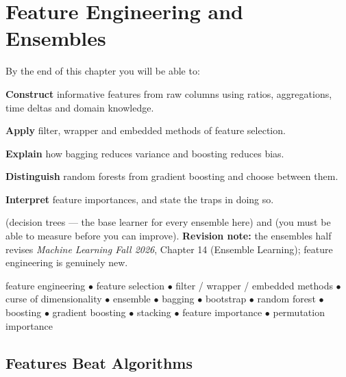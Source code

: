 \chapter{Feature Engineering and Ensembles}\label{ch:features}

\begin{outcomes}
By the end of this chapter you will be able to:
\begin{tight}
  \item \textbf{Construct} informative features from raw columns using ratios, aggregations, time deltas and domain knowledge.
  \item \textbf{Apply} filter, wrapper and embedded methods of feature selection.
  \item \textbf{Explain} how bagging reduces variance and boosting reduces bias.
  \item \textbf{Distinguish} random forests from gradient boosting and choose between them.
  \item \textbf{Interpret} feature importances, and state the traps in doing so.
\end{tight}
\end{outcomes}

\begin{prereq}
 (decision trees --- the base learner for every ensemble
here) and  (you must be able to measure before you can improve).
\textbf{Revision note:} the ensembles half revises \emph{Machine Learning Fall
2026}, Chapter 14 (Ensemble Learning); feature engineering is genuinely new.
\end{prereq}

\begin{keyterms}
feature engineering $\bullet$ feature selection $\bullet$ filter / wrapper /
embedded methods $\bullet$ curse of dimensionality $\bullet$ ensemble $\bullet$
bagging $\bullet$ bootstrap $\bullet$ random forest $\bullet$ boosting $\bullet$
gradient boosting $\bullet$ stacking $\bullet$ feature importance $\bullet$
permutation importance
\end{keyterms}

\section{Features Beat Algorithms}

